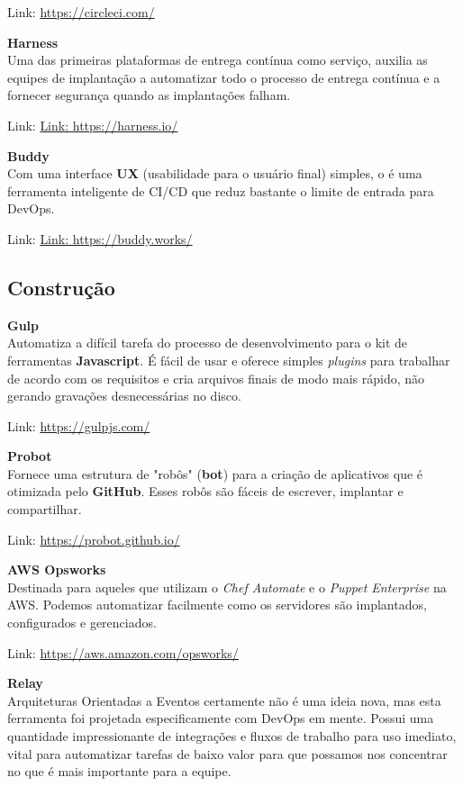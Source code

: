 \documentclass[fleqn,10pt]{../sty/SelfArx} %
\begin{document}
Link: \url{https://circleci.com/}

\textbf{Harness} \\
Uma das primeiras plataformas de entrega contínua como serviço, auxilia as equipes de implantação a automatizar todo o processo de entrega contínua e a fornecer segurança quando as implantações falham.

Link: \url{Link: https://harness.io/}

\textbf{Buddy} \\
Com uma interface \textbf{UX} (usabilidade para o usuário final) simples, o é uma ferramenta inteligente de CI/CD que reduz bastante o limite de entrada para DevOps.

Link: \url{Link: https://buddy.works/}

\subsection*{Construção}

\textbf{Gulp} \\
Automatiza a difícil tarefa do processo de desenvolvimento para o kit de ferramentas \textbf{Javascript}. É fácil de usar e oferece simples \textit{plugins} para trabalhar de acordo com os requisitos e cria arquivos finais de modo mais rápido, não gerando gravações desnecessárias no disco.

Link: \url{https://gulpjs.com/}

\textbf{Probot} \\
Fornece uma estrutura de "robôs" (\textbf{bot}) para a criação de aplicativos que é otimizada pelo \textbf{GitHub}. Esses robôs são fáceis de escrever, implantar e compartilhar.

Link: \url{https://probot.github.io/}

\textbf{AWS Opsworks} \\
Destinada para aqueles que utilizam o \textit{Chef Automate} e o \textit{Puppet Enterprise} na AWS. Podemos automatizar facilmente como os servidores são implantados, configurados e gerenciados.

Link: \url{https://aws.amazon.com/opsworks/}

\textbf{Relay} \\
Arquiteturas Orientadas a Eventos certamente não é uma ideia nova, mas esta ferramenta foi projetada especificamente com DevOps em mente. Possui uma quantidade impressionante de integrações e fluxos de trabalho para uso imediato, vital para automatizar tarefas de baixo valor para que possamos nos concentrar no que é mais importante para a equipe.
\end{document}
